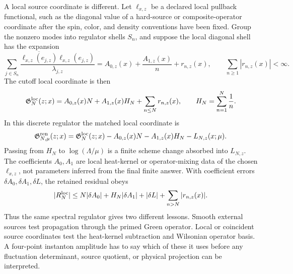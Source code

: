 \begin{controlledapproximation}
A local source coordinate is different.  Let \(\ell_{x,z}\) be a declared
local pullback functional, such as the diagonal value of a hard-source or
composite-operator coordinate after the spin, color, and density conventions
have been fixed.  Group the nonzero modes into regulator shells \(S_n\), and
suppose the local diagonal shell has the expansion
\begin{equation}
  \sum_{j\in S_n}
  \frac{\overline{\ell_{x,z}(e_{j,z})}\ell_{x,z}(e_{j,z})}
       {\lambda_{j,z}}
  =
  A_{0,z}(x)+\frac{A_{1,z}(x)}{n}+r_{n,z}(x),
  \qquad
  \sum_{n\ge1}|r_{n,z}(x)|<\infty .
  \label{eq:instanton-spectral-local-shell-expansion}
\end{equation}
The cutoff local coordinate is then
\[
  \mathfrak G_N^{\rm loc}(z;x)
  =
  A_{0,z}(x)N+A_{1,z}(x)H_N
  +\sum_{n\le N}r_{n,z}(x),
  \qquad
  H_N=\sum_{n=1}^{N}\frac1n .
\]
In this discrete regulator the matched local coordinate is
\begin{equation}
  \mathfrak G_{N,\mu}^{\rm ren}(z;x)
  =
  \mathfrak G_N^{\rm loc}(z;x)
  -A_{0,z}(x)N-A_{1,z}(x)H_N
  -L_{N,z}(x;\mu).
  \label{eq:instanton-spectral-renormalized-local-green}
\end{equation}
Passing from \(H_N\) to \(\log(\Lambda/\mu)\) is a finite scheme change
absorbed into \(L_{N,z}\).  The coefficients \(A_0,A_1\) are local
heat-kernel or operator-mixing data of the chosen \(\ell_{x,z}\), not
parameters inferred from the final finite answer.  With coefficient errors
\(\delta A_0,\delta A_1,\delta L\), the retained residual obeys
\begin{equation}
  |R_N^{\rm loc}|
  \le
  N|\delta A_0|+H_N|\delta A_1|+|\delta L|
  +\sum_{n>N}|r_{n,z}(x)|.
  \label{eq:instanton-spectral-local-green-bound}
\end{equation}
Thus the same spectral regulator gives two different lessons.  Smooth
external sources test propagation through the primed Green operator.  Local or
coincident source coordinates test the heat-kernel subtraction and Wilsonian
operator basis.  A four-point instanton amplitude has to say which of these it
uses before any fluctuation determinant, source quotient, or physical
projection can be interpreted.
\end{controlledapproximation}

